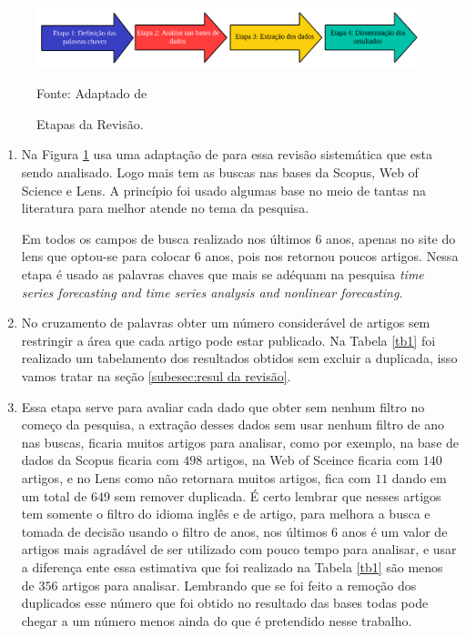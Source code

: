 \begin{figure}[H]
	\centering
	\caption{Etapas da Revisão.}
	\label{fig:rsl}
	\includegraphics[width=0.5\linewidth]{Revisao/Figuras/RSL}
	
	Fonte: Adaptado de 
\end{figure}
\begin{enumerate}[start=1, label = {\textbf{Etapa} \arabic* } ]
\item \label{etp:rev-1}Na Figura \ref{fig:rsl} usa uma adaptação de  para essa revisão sistemática que esta sendo analisado. Logo mais tem as buscas nas bases da Scopus, Web of Science e Lens. A princípio foi usado algumas base no meio de tantas na literatura para melhor atende no tema da pesquisa.




Em todos os campos de busca realizado nos últimos 6 anos, apenas no site do lens que optou-se para colocar 6 anos, pois nos retornou poucos artigos. Nessa etapa é usado as palavras chaves que mais se adéquam na pesquisa \textit{time series forecasting and time series analysis and nonlinear forecasting}.

	\item \label{etp:rev-2} No cruzamento de palavras obter um número considerável de artigos sem restringir a área que cada artigo pode estar publicado. Na Tabela \ref{tb1} foi realizado um tabelamento dos resultados obtidos sem excluir a duplicada, isso vamos tratar na seção \ref{subesec:resul da revisão}.

\item \label{etp:rev-3}Essa etapa serve para avaliar cada dado que obter sem nenhum filtro no começo da pesquisa, a extração desses dados sem usar nenhum filtro de ano nas buscas, ficaria muitos artigos para analisar, como por exemplo, na base de dados da Scopus ficaria com $498$ artigos, na Web of Sceince ficaria com $140$ artigos, e no Lens como não retornara muitos artigos, fica com $11$ dando em um total de $649$ sem remover duplicada. É certo lembrar que nesses artigos tem somente o filtro do idioma inglês e de artigo, para melhora a busca e tomada de decisão usando o filtro de anos, nos últimos 6 anos é um valor de artigos mais agradável de ser utilizado com pouco tempo para analisar, e usar a diferença ente essa estimativa que foi realizado na Tabela \ref{tb1} são menos de $ 356 $ artigos para analisar. Lembrando que se foi feito a remoção dos duplicados esse número que foi obtido no resultado das bases todas pode chegar a um número menos ainda do que é pretendido nesse trabalho.


\end{enumerate}
